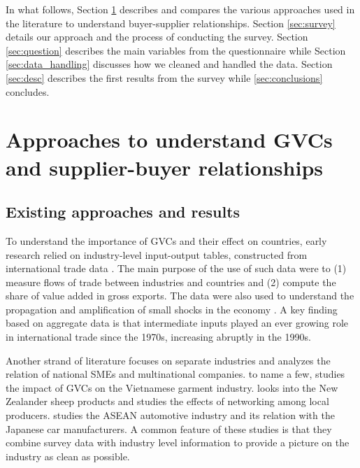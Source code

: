\documentclass[final, dvipsnames, authoryear,12pt]{elsarticle}
\begin{document}
In what follows, Section \ref{sec: approach} describes and compares the various approaches used in the literature to understand buyer-supplier relationships. Section \ref{sec:survey} details our approach and the process of conducting the survey. Section \ref{sec:question} describes the main variables from the questionnaire while Section \ref{sec:data_handling} discusses how we cleaned and handled the data. Section \ref{sec:desc} describes the first results from the survey while \ref{sec:conclusions} concludes.  

\section{Approaches to understand GVCs and supplier-buyer relationships} 
\label{sec: approach}

\subsection{Existing approaches and results}

To understand the importance of GVCs and their effect on countries, early research relied on industry-level input-output tables, constructed from international trade data \citep{johnson2012accounting, hummels2001nature}. The main purpose of the use of such data were to (1) measure flows of trade between industries and countries and (2) compute the share of value added in gross exports. The data were also used to understand the propagation and amplification of small shocks in the economy \citep{acemoglu2016networks}. A key finding based on aggregate data is that intermediate inputs played an ever growing role in international trade since the 1970s, increasing abruptly in the 1990s. 

Another strand of literature focuses on separate industries and analyzes the relation of national SMEs and multinational companies. to name a few, \citep{nadvi2004vietnam} studies the impact of GVCs on the Vietnamese garment industry. \citep{heron2001global} looks into the New Zealander sheep products and studies the effects of networking among local producers. \cite{arfani1production} studies the ASEAN automotive industry and its relation with the Japanese car manufacturers. A common feature of these studies is that they combine survey data with industry level information to provide a picture on the industry as clean as possible.  
\end{document}
